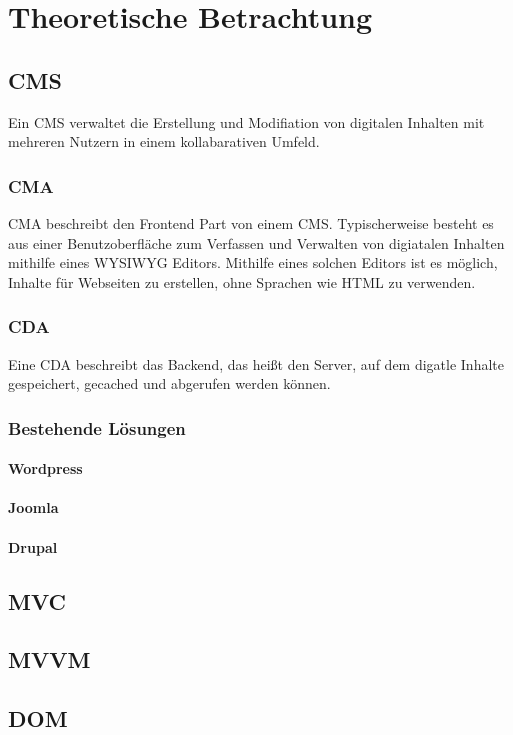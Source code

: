 \chapter{Theoretische Betrachtung}
\section{\acl{CMS}}
Ein \ac{CMS} verwaltet die Erstellung und Modifiation von digitalen Inhalten mit
mehreren Nutzern in einem kollabarativen Umfeld.
\subsection{\acl{CMA}}
\ac{CMA} beschreibt den Frontend Part von einem \ac{CMS}. Typischerweise besteht
es aus einer Benutzoberfläche zum Verfassen und Verwalten von digiatalen
Inhalten mithilfe eines \ac{WYSIWYG} Editors. Mithilfe eines solchen Editors ist
es möglich, Inhalte für Webseiten zu erstellen, ohne Sprachen wie \ac{HTML} zu verwenden.
\subsection{\acl{CDA}}
Eine \ac{CDA} beschreibt das Backend, das heißt den Server, auf dem digatle
Inhalte gespeichert, gecached und abgerufen werden können.
\subsection{Bestehende Lösungen}
\subsubsection{Wordpress}
\subsubsection{Joomla}
\subsubsection{Drupal}

\section{\acs{MVC}}
\section{\acs{MVVM}}

\section{\acl{DOM}}
